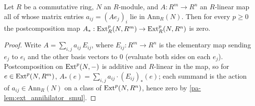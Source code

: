 \begin{lemma}
  \label{pa-lem:ext_matrix_collapse}
  \leanok

  Let \(R\) be a commutative ring, \(N\) an \(R\)-module, and
  \(A : R^m \to R^n\) an \(R\)-linear map all of whose matrix entries
  \(a_{ij} = (A e_j)_i\) lie in \(\mathrm{Ann}_R(N)\). Then for every \(p \geq 0\) the
  postcomposition map \(A_* : \operatorname{Ext}^p_R(N, R^m) \to \operatorname{Ext}^p_R(N, R^n)\) is zero.
\end{lemma}
\begin{proof}
  \leanok
  Write \(A = \sum_{i,j} a_{ij}\, E_{ij}\), where \(E_{ij} : R^m \to R^n\) is the
  elementary map sending \(e_j\) to \(e_i\) and the other basis vectors to \(0\)
  (evaluate both sides on each \(e_j\)). Postcomposition on \(\operatorname{Ext}^p(N, -)\) is additive
  and \(R\)-linear in the map, so for \(e \in \operatorname{Ext}^p(N, R^m)\),
  \(A_*(e) = \sum_{i,j} a_{ij} \cdot (E_{ij})_*(e)\); each summand is the action of
  \(a_{ij} \in \mathrm{Ann}_R(N)\) on a class of \(\operatorname{Ext}^p(N, R^n)\), hence zero by
  \ref{pa-lem:ext_annihilator_smul}.
\end{proof}

